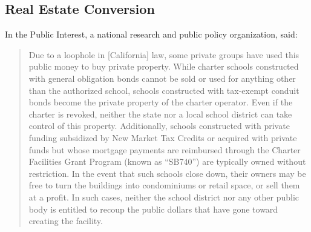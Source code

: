 \subsection{Real Estate Conversion}%
\label{sec:real-estate-conv}\indent%

In the Public Interest, a national research and public policy organization, said:
\begin{quotation}\noindent
  Due to a loophole in [California] law, some private groups have used this public money to buy private property. While charter schools constructed with general obligation bonds cannot be sold or used for anything other than the authorized school, schools constructed with tax-exempt conduit bonds become the private property of the charter operator. Even if the charter is revoked, neither the state nor a local school district can take control of this property. Additionally, schools constructed with private funding subsidized by New Market Tax Credits or acquired with private funds but whose mortgage payments are reimbursed through the Charter Facilities Grant Program (known as “SB740”) are typically owned without restriction. In the event that such schools close down, their owners may be free to turn the buildings into condominiums or retail space, or sell them at a profit. In such cases, neither the school district nor any other public body is entitled to recoup the public dollars that have gone toward creating the facility. \parencite[6]{ITPI2018}
\end{quotation}

